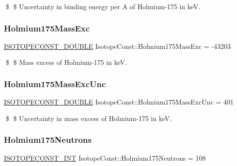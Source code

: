 \$ \$ Uncertainty in binding energy per A of Holmium-\/175 in keV. \mbox{\label{group___isotope_const-_holmium-_ho175_ga9b13167da30bcb86754508f602469e87}} 
\subsubsection{\texorpdfstring{Holmium175\+Mass\+Exc}{Holmium175MassExc}}
{\footnotesize\ttfamily \mbox{\hyperlink{group___isotope_const-_macros_ga8f45a7272ce02c0b4c65c44636ed719a}{I\+S\+O\+T\+O\+P\+E\+C\+O\+N\+S\+T\+\_\+\+D\+O\+U\+B\+LE}} Isotope\+Const\+::\+Holmium175\+Mass\+Exc = -\/43203}

\$ \$ Mass excess of Holmium-\/175 in keV. \mbox{\label{group___isotope_const-_holmium-_ho175_gafa0ea4c9fba2871e163642528dc8b097}} 
\subsubsection{\texorpdfstring{Holmium175\+Mass\+Exc\+Unc}{Holmium175MassExcUnc}}
{\footnotesize\ttfamily \mbox{\hyperlink{group___isotope_const-_macros_ga8f45a7272ce02c0b4c65c44636ed719a}{I\+S\+O\+T\+O\+P\+E\+C\+O\+N\+S\+T\+\_\+\+D\+O\+U\+B\+LE}} Isotope\+Const\+::\+Holmium175\+Mass\+Exc\+Unc = 401}

\$ \$ Uncertainty in mass excess of Holmium-\/175 in keV. \mbox{\label{group___isotope_const-_holmium-_ho175_gafe5a07799a3230604c9c6e68381a1cd6}} 
\subsubsection{\texorpdfstring{Holmium175\+Neutrons}{Holmium175Neutrons}}
{\footnotesize\ttfamily \mbox{\hyperlink{group___isotope_const-_macros_ga5f18360b3e99483a35c32d789e62621c}{I\+S\+O\+T\+O\+P\+E\+C\+O\+N\+S\+T\+\_\+\+I\+NT}} Isotope\+Const\+::\+Holmium175\+Neutrons = 108}


